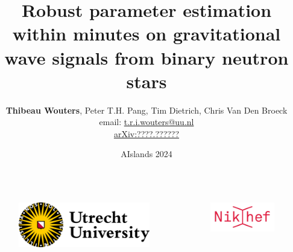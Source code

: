 \documentclass[usenames,dvipsnames,t]{beamer}
\title[\textsc{Jim} for BNS PE] %
{Robust parameter estimation within minutes on gravitational wave signals from binary neutron stars}
\author[Thibeau Wouters]{\small{\textbf{Thibeau Wouters}, Peter T.H. Pang, Tim Dietrich, Chris Van Den Broeck} \\ \vspace{7mm} email: \href{mailto:t.r.i.wouters@uu.nl}{t.r.i.wouters@uu.nl} \\ \vspace{3mm} \href{https://arxiv.org/}{arXiv:????.??????}}
\date{AIslands 2024}
\begin{document}
{


\begin{frame}[plain]
\titlepage

\begin{columns}
  \begin{figure}
    \centering
    \vspace{1.5mm}
    \includegraphics[width=0.75\linewidth]{Figures/utrecht-university.png}
  \end{figure}
  \begin{figure}
    \centering
    \includegraphics[width=0.75\linewidth]{Figures/Nikhef_logo-transparent.png}
  \end{figure}
\end{columns}



\end{frame}
}
\end{document}
